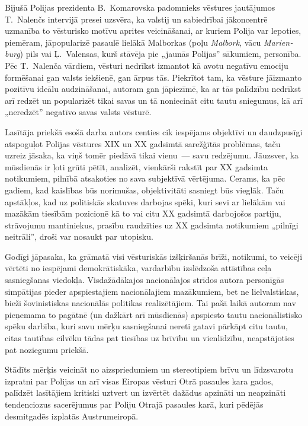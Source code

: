 \documentclass[twoside,a5paper,12pt,fleqn,openany]{extbook}
\newcommand{\pltxti}[1]{\textit{\textpolish{#1}}}
\newcommand{\detxti}[1]{\textit{\textgerman{#1}}}
\begin{document}
Bijušā Polijas prezidenta B.~Komarovska padomnieks vēstures jautājumos T.~Nalenčs intervijā presei uzsvēra, ka valstij un sabiedrībai jākoncentrē uzmanība to vēsturisko motīvu aprites veicināšanai, ar kuriem Polija var lepoties, piemēram, jāpopularizē pasaulē lielākā Malborkas (poļu \pltxti{Malbork}, vācu \detxti{Marienburg}) pils vai Ļ.~Valensas, kurš stāvēja pie „jaunās Polijas” sākumiem, personība. Pēc T.~Nalenča vārdiem, vēsturi nedrīkst izmantot kā avotu negatīvu emociju formēšanai gan valsts iekšienē, gan ārpus tās. Piekrītot tam, ka vēsture jāizmanto pozitīvu ideālu audzināšanai, autoram gan jāpiezīmē, ka ar tās palīdzību nedrīkst arī redzēt un popularizēt tikai savas un tā noniecināt citu tautu sniegumus, kā arī „neredzēt” negatīvo savas valsts vēsturē.

Lasītāja priekšā esošā darba autors centies cik iespējams objektīvi un daudzpusīgi atspoguļot Polijas vēstures XIX un XX gadsimtā sarežģītās problēmas, taču uzreiz jāsaka, ka viņš tomēr piedāvā tikai vienu~--- savu redzējumu. Jāuzsver, ka mūsdienās ir ļoti grūti pētīt, analizēt, vienkārši rakstīt par XX gadsimta notikumiem, pilnībā atsakoties no sava subjektīvā vērtējuma. Cerams, ka pēc gadiem, kad kaislības būs norimušas, objektivitāti sasniegt būs vieglāk. Taču apstākļos, kad uz politiskās skatuves darbojas spēki, kuri sevi ar lielākām vai mazākām tiesībām pozicionē kā to vai citu XX gadsimtā darbojošos partiju, strāvojumu mantiniekus, prasību raudzīties uz XX gadsimta notikumiem „pilnīgi neitrāli”, droši var nosaukt par utopisku.

Godīgi jāpasaka, ka grāmatā visi vēsturiskās izšķiršanās brīži, notikumi, to veicēji vērtēti no iespējami demokrātiskāka, vardarbību izslēdzoša attīstības ceļa sasniegšanas viedokļa. Visdažādākajos nacionālajos strīdos autora personīgās simpātijas pieder apspiestajiem nacionālajiem mazākumiem, bet ne lielvalstiskas, bieži šovinistiskas nacionālās politikas realizētājiem. Tai pašā laikā autoram nav pieņemama to pagātnē (un dažkārt arī mūsdienās) apspiesto tautu nacionālistisko spēku darbība, kuri savu mērķu sasniegšanai nereti gatavi pārkāpt citu tautu, citas tautības cilvēku tādas pat tiesības uz brīvību un vienlīdzību, neapstājoties pat noziegumu priekšā.

Stādīts mērķis veicināt no aizspriedumiem un stereotipiem brīvu un līdzsvarotu izpratni par Polijas un arī visas Eiropas vēsturi Otrā pasaules kara gados, palīdzēt lasītājiem kritiski uztvert un izvērtēt dažādus apzināti un neapzināti tendenciozus sacerējumus par Poliju Otrajā pasaules karā, kuri pēdējās desmitgadēs izplatās Austrumeiropā.
\end{document}
